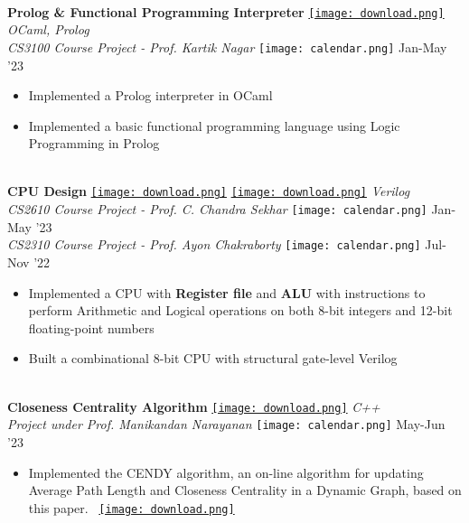 \documentclass[10pt,article]{article}
\newcommand{\myMargin}{0.15in}
\newcommand{\myfont}[2]{\fontsize{#1}{#1}\selectfont #2}
\newcommand{\projecttopic}[1]{\myfont{9pt}{\textbf{#1}}}
\newcommand{\projectdesc}[1]{\myfont{9pt}{\textcolor{projDescColor}{\textit{#1}}}}
\newcommand{\mylink}[1]{\href{#1}{\texttt{[image: download.png]}}}
\newcommand{\mycal}[1]{\texttt{[image: calendar.png]} \myfont{9}{#1}}
\begin{document}
\begin{multicols*}{2}
\noindent
\hrulefill \\ [-0.5cm]
\projecttopic{Prolog \& Functional Programming Interpreter}
\mylink{insert link here}
\hfill    \textcolor{projDescColor}{\textit{OCaml, Prolog}}  \\[0.1cm]
\projectdesc{CS3100 Course Project - Prof. Kartik Nagar} \hfill \mycal{Jan-May '23} \\
\noindent
\vspace{-0.5cm}
\begin{itemize}[leftmargin=\myMargin]
    \setlength \itemsep{-0.2em}
    \item Implemented a Prolog interpreter in OCaml
    \item Implemented a basic functional programming language using Logic Programming in Prolog
\end{itemize}
\vspace{5pt}

\noindent
\hrulefill \\ [-0.5cm]
\projecttopic{CPU Design} \mylink{https://github.com/Snehadeep-Gayen/Computer-Organisation-and-Architecture-Lab} 
\mylink{https://github.com/Snehadeep-Gayen/Simple_CPU_Design} 
\hfill    \textcolor{projDescColor}{\textit{Verilog}}  \\[0.1cm]
\projectdesc{CS2610 Course Project - Prof. C. Chandra Sekhar} \hfill \mycal{Jan-May '23} \\
\projectdesc{CS2310 Course Project - Prof. Ayon Chakraborty} \hfill \mycal{Jul-Nov '22}
\noindent
\vspace{-0.2cm}
\begin{itemize}[leftmargin=\myMargin]
    \setlength \itemsep{-0.2em}
    \item Implemented a CPU with \textbf{Register file} and \textbf{ALU} with instructions to perform Arithmetic 
    and Logical operations on both 8-bit integers and  12-bit floating-point numbers
    \item Built a combinational 8-bit CPU with structural gate-level Verilog 
\end{itemize}
\vspace{5pt}

\noindent
\hrulefill \\ [-0.5cm]
\projecttopic{Closeness Centrality Algorithm} \mylink{https://github.com/Snehadeep-Gayen/CENDY-Incremental-CC}
 \hfill \textcolor{projDescColor}{\textit{C++}} \\ [0.1cm]
\projectdesc{Project under Prof. Manikandan Narayanan} \hfill \mycal{May-Jun '23}
\vspace{-0.2cm}
\begin{itemize}[leftmargin=\myMargin]
    \item Implemented the CENDY algorithm, an on-line algorithm for updating Average Path Length and Closeness Centrality in a Dynamic Graph, based on this paper. \ \mylink{https://ieeexplore.ieee.org/stamp/stamp.jsp?tp=&arnumber=6729571&isnumber=6729471}
 \end{itemize}
\vspace{-0.2cm}


\end{multicols*}
\end{document}
